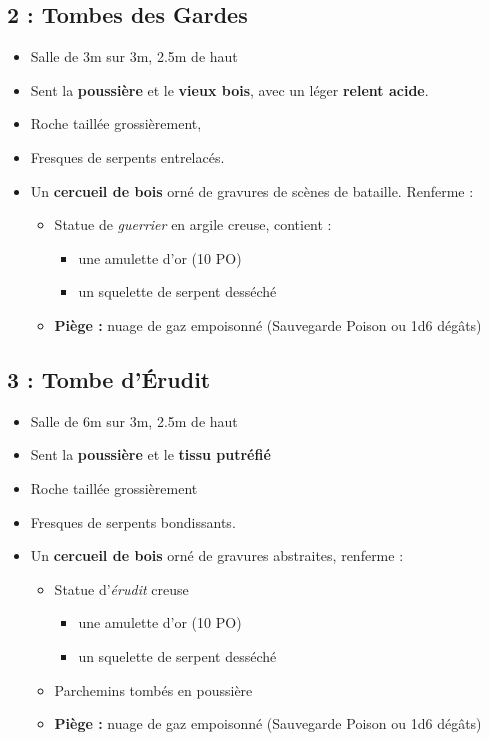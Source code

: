 \subsection{2 : Tombes des Gardes}\label{n1:s2}
\begin{itemize}
  \item Salle de 3m sur 3m, 2.5m de haut
  \item Sent la \textbf{poussière} et le \textbf{vieux bois}, avec un léger \textbf{relent acide}.
  \item Roche taillée grossièrement, 
  \item Fresques de serpents entrelacés.
  \item Un \textbf{cercueil de bois} orné de gravures de scènes de bataille. Renferme :
  \begin{itemize}
    \item Statue de \emph{guerrier} en argile creuse, contient :
    \begin{itemize}
      \item une amulette d’or (10 PO)
      \item un squelette de serpent desséché
    \end{itemize}
    \item \textbf{Piège :} nuage de gaz empoisonné (Sauvegarde Poison ou 1d6 dégâts)
  \end{itemize}
\end{itemize}

\vfill\break
\subsection{3 : Tombe d’Érudit}\label{n1:s3}
\begin{itemize}
  \item Salle de 6m sur 3m, 2.5m de haut
  \item Sent la \textbf{poussière} et le \textbf{tissu putréfié}
  \item Roche taillée grossièrement
  \item Fresques de serpents bondissants.
  \item Un \textbf{cercueil de bois} orné de gravures abstraites, renferme :
  \begin{itemize}
    \item Statue d'\emph{érudit} creuse
    \begin{itemize}
      \item une amulette d’or (10 PO)
      \item un squelette de serpent desséché
    \end{itemize}
    \item Parchemins tombés en poussière
    \item \textbf{Piège :} nuage de gaz empoisonné (Sauvegarde Poison ou 1d6 dégâts)
  \end{itemize}
\end{itemize}

